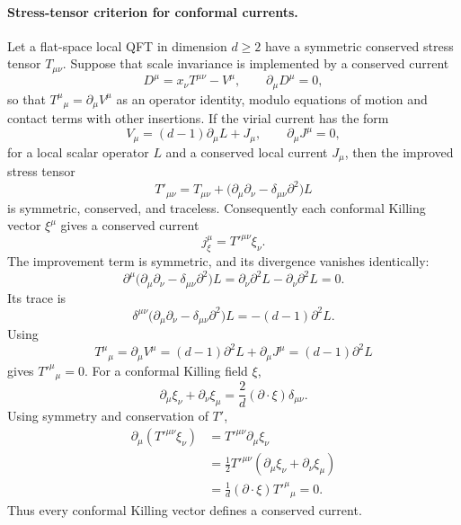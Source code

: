 \paragraph{Stress-tensor criterion for conformal currents.}
Let a flat-space local QFT in dimension \(d\ge2\) have a symmetric conserved
stress tensor \(T_{\mu\nu}\).  Suppose that scale invariance is implemented by
a conserved current
\[
  D^\mu=x_\nu T^{\mu\nu}-V^\mu,
  \qquad
  \partial_\mu D^\mu=0,
\]
so that \(T^\mu{}_\mu=\partial_\mu V^\mu\) as an operator identity, modulo
equations of motion and contact terms with other insertions.  If the virial
current has the form
\[
  V_\mu=(d-1)\partial_\mu L+J_\mu,
  \qquad
  \partial_\mu J^\mu=0,
\]
for a local scalar operator \(L\) and a conserved local current \(J_\mu\),
then the improved stress tensor
\[
  T'_{\mu\nu}
  =
  T_{\mu\nu}
  +
  \bigl(\partial_\mu\partial_\nu-\delta_{\mu\nu}\partial^2\bigr)L
\]
is symmetric, conserved, and traceless.  Consequently each conformal Killing
vector \(\xi^\mu\) gives a conserved current
\[
  j^\mu_\xi=T'^{\mu\nu}\xi_\nu .
\]
The improvement term is symmetric, and its divergence vanishes identically:
\[
  \partial^\mu
  \bigl(\partial_\mu\partial_\nu-\delta_{\mu\nu}\partial^2\bigr)L
  =
  \partial_\nu\partial^2L-\partial_\nu\partial^2L
  =
  0.
\]
Its trace is
\[
  \delta^{\mu\nu}
  \bigl(\partial_\mu\partial_\nu-\delta_{\mu\nu}\partial^2\bigr)L
  =
  -(d-1)\partial^2L .
\]
Using
\[
  T^\mu{}_\mu=\partial_\mu V^\mu
  =(d-1)\partial^2L+\partial_\mu J^\mu
  =(d-1)\partial^2L
\]
gives \(T'^\mu{}_\mu=0\).  For a conformal Killing field
\(\xi\),
\[
  \partial_\mu\xi_\nu+\partial_\nu\xi_\mu
  =
  \frac{2}{d}(\partial\cdot\xi)\delta_{\mu\nu}.
\]
Using symmetry and conservation of \(T'\),
\[
\begin{aligned}
  \partial_\mu(T'^{\mu\nu}\xi_\nu)
  &=
  T'^{\mu\nu}\partial_\mu\xi_\nu \\
  &=
  \frac12T'^{\mu\nu}(\partial_\mu\xi_\nu+\partial_\nu\xi_\mu)\\
  &=
  \frac1d(\partial\cdot\xi)T'^\mu{}_\mu
  =
  0 .
\end{aligned}
\]
Thus every conformal Killing vector defines a conserved current.

